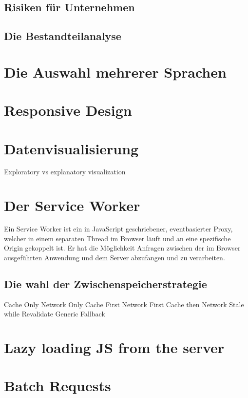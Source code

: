 \subsection{Risiken für Unternehmen}

\subsection{Die Bestandteilanalyse}

\section{Die Auswahl mehrerer Sprachen}

\section{Responsive Design}

\section{Datenvisualisierung}
Exploratory vs explanatory visualization

\section{Der Service Worker}
Ein Service Worker ist ein in JavaScript geschriebener,
eventbasierter Proxy, welcher in einem separaten Thread im Browser
läuft und an eine spezifische Origin gekoppelt ist. Er hat
die Möglichkeit Anfragen zwischen der im Browser ausgeführten
Anwendung und dem Server abzufangen und zu verarbeiten.

\subsection{Die wahl der Zwischenspeicherstrategie}
Cache Only
Network Only
Cache First
Network First
Cache then Network
Stale while Revalidate
Generic Fallback

\section{Lazy loading JS from the server}

\section{Batch Requests}

